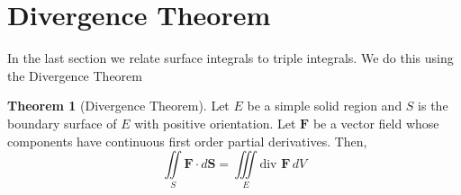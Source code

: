 \documentclass[10pt,reqno]{book}
\theoremstyle{definition}
\newtheorem{theorem}{Theorem}[section]
\renewcommand{\vec}[1]{\mathbf{#1}}
\begin{document}
	\section{Divergence Theorem}
	
	In the last section we relate surface integrals to triple integrals. We do this using the Divergence Theorem
	\begin{theorem}[Divergence Theorem]
		Let $ E $ be a simple solid region and $ S $ is the boundary surface of $ E $ with positive orientation. Let $ \vec{F} $ be a vector field whose components have continuous first order partial derivatives. Then,
		\[ \iint\limits_S \vec{F} \cdot d\vec{S} = \iiint\limits_E \text{div } \vec{F}\,dV \]
	\end{theorem}
	
	
	
	\pagestyle{plain}
	
\end{document}
